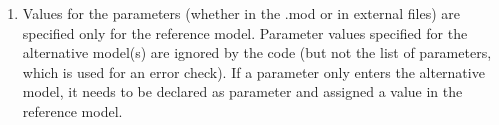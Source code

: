 \documentclass[12pt]{article}
\begin{document}
\begin{enumerate}
\item Values for the parameters (whether in the .mod or in external files)
are specified only for the reference model. Parameter values specified for
the alternative model(s) are ignored by the code (but not the list of
parameters, which is used for an error check). If a parameter only enters
the alternative model, it needs to be declared as parameter and assigned a
value in the reference model.
\end{enumerate}
\end{document}
